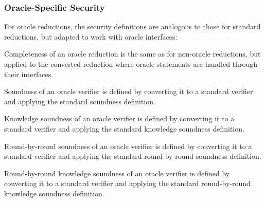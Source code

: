 \subsubsection{Oracle-Specific Security}

For oracle reductions, the security definitions are analogous to those for standard reductions, but adapted to work with oracle interfaces:

\begin{definition}
    \label{def:oracle_reduction_completeness}
    Completeness of an oracle reduction is the same as for non-oracle reductions, but applied to the
    converted reduction where oracle statements are handled through their interfaces.
\end{definition}

\begin{definition}
    \label{def:oracle_verifier_soundness}
    Soundness of an oracle verifier is defined by converting it to a standard verifier and applying
    the standard soundness definition.
\end{definition}

\begin{definition}
    \label{def:oracle_verifier_knowledge_soundness}
    Knowledge soundness of an oracle verifier is defined by converting it to a standard verifier
    and applying the standard knowledge soundness definition.
\end{definition}

\begin{definition}
    \label{def:oracle_verifier_rbr_soundness}
    Round-by-round soundness of an oracle verifier is defined by converting it to a standard verifier
    and applying the standard round-by-round soundness definition.
\end{definition}

\begin{definition}
    \label{def:oracle_verifier_rbr_knowledge_soundness}
    Round-by-round knowledge soundness of an oracle verifier is defined by converting it to a standard
    verifier and applying the standard round-by-round knowledge soundness definition.
\end{definition}


